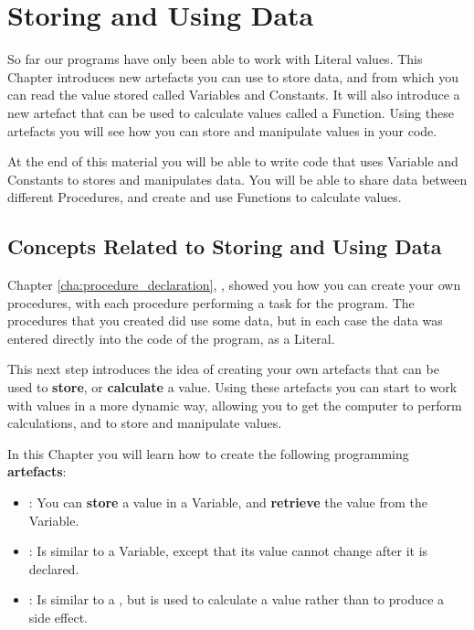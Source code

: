 \chapter{Storing and Using Data} %
\label{cha:storing_and_using_data}

So far our programs have only been able to work with Literal values. This Chapter introduces new artefacts you can use to store data, and from which you can read the value stored called Variables and Constants. It will also introduce a new artefact that can be used to calculate values called a Function. Using these artefacts you will see how you can store and manipulate values in your code.

At the end of this material you will be able to write code that uses Variable and Constants to stores and manipulates data. You will be able to share data between different Procedures, and create and use Functions to calculate values.

\minitoc


\clearpage
\section{Concepts Related to Storing and Using Data} %
\label{sec:concepts_related_to_storing_and_using_data}

Chapter \ref{cha:procedure_declaration}, , showed you how you can create your own procedures, with each procedure performing a task for the program. The procedures that you created did use some data, but in each case the data was entered directly into the code of the program, as a Literal.

This next step introduces the idea of creating your own artefacts that can be used to \textbf{store}, or \textbf{calculate} a value. Using these artefacts you can start to work with values in a more dynamic way, allowing you to get the computer to perform calculations, and to store and manipulate values.

In this Chapter you will learn how to create the following programming \textbf{artefacts}:
\begin{itemize}
  \item {}: You can \textbf{store} a value in a Variable, and \textbf{retrieve} the value from the Variable.
  \item {}: Is similar to a Variable, except that its value cannot change after it is declared.
  \item {}: Is similar to a , but is used to calculate a value rather than to produce a side effect.
\end{itemize}


